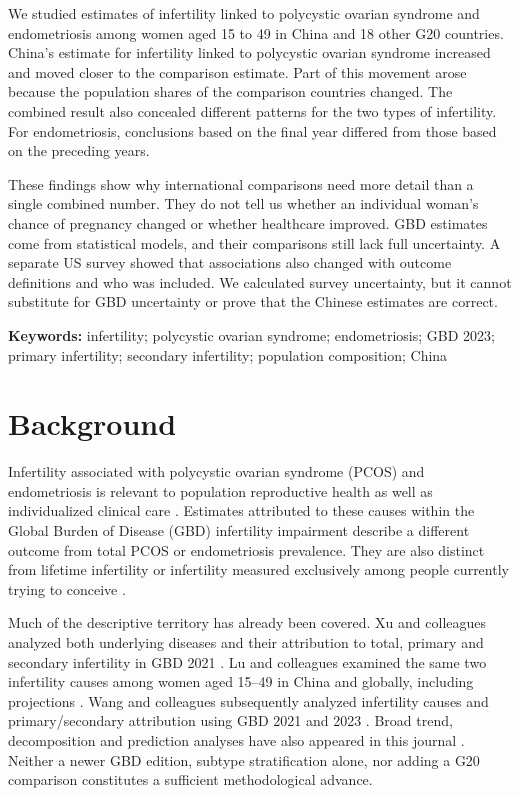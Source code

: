 \documentclass[11pt,a4paper]{article}
\begin{document}
We studied estimates of infertility linked to polycystic ovarian syndrome and endometriosis among women aged 15 to 49 in China and 18 other G20 countries. China's estimate for infertility linked to polycystic ovarian syndrome increased and moved closer to the comparison estimate. Part of this movement arose because the population shares of the comparison countries changed. The combined result also concealed different patterns for the two types of infertility. For endometriosis, conclusions based on the final year differed from those based on the preceding years.

These findings show why international comparisons need more detail than a single combined number. They do not tell us whether an individual woman's chance of pregnancy changed or whether healthcare improved. GBD estimates come from statistical models, and their comparisons still lack full uncertainty. A separate US survey showed that associations also changed with outcome definitions and who was included. We calculated survey uncertainty, but it cannot substitute for GBD uncertainty or prove that the Chinese estimates are correct.

\textbf{Keywords:} infertility; polycystic ovarian syndrome; endometriosis; GBD 2023; primary infertility; secondary infertility; population composition; China

\section{Background}
Infertility associated with polycystic ovarian syndrome (PCOS) and endometriosis is relevant to population reproductive health as well as individualized clinical care \cite{pcos,eshre}. Estimates attributed to these causes within the Global Burden of Disease (GBD) infertility impairment describe a different outcome from total PCOS or endometriosis prevalence. They are also distinct from lifetime infertility or infertility measured exclusively among people currently trying to conceive \cite{gbd}.

Much of the descriptive territory has already been covered. Xu and colleagues analyzed both underlying diseases and their attribution to total, primary and secondary infertility in GBD 2021 \cite{xu}. Lu and colleagues examined the same two infertility causes among women aged 15--49 in China and globally, including projections \cite{lu}. Wang and colleagues subsequently analyzed infertility causes and primary/secondary attribution using GBD 2021 and 2023 \cite{wang}. Broad trend, decomposition and prediction analyses have also appeared in this journal \cite{feng}. Neither a newer GBD edition, subtype stratification alone, nor adding a G20 comparison constitutes a sufficient methodological advance.
\end{document}
